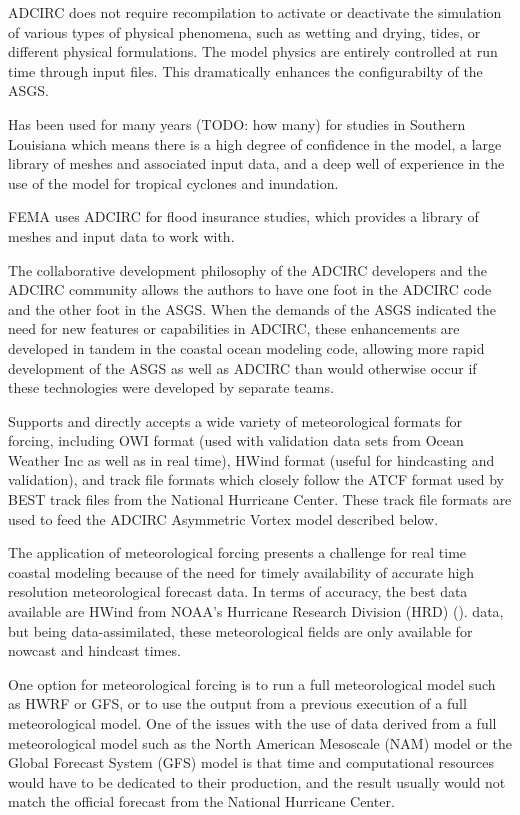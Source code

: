 \documentclass[jmse,article,submit,moreauthors,pdftex,12pt,a4paper]{mdpi}
\begin{document}
ADCIRC does not require recompilation to activate or deactivate the 
simulation of various types of physical phenomena, such as wetting 
and drying, tides, or different physical formulations. The model 
physics are entirely controlled at run time through input files. 
This dramatically enhances the configurabilty of the ASGS. 

Has been used for many years (TODO: how many) for studies in 
Southern Louisiana which means there is a high degree of confidence 
in the model, a large library of meshes and associated input data, 
and a deep well of experience in the use of the model for tropical 
cyclones and inundation. 

FEMA uses ADCIRC for flood insurance studies, which provides a library
of meshes and input data to work with.

The collaborative development philosophy of the ADCIRC developers
and the ADCIRC community allows the authors to have one foot in the
ADCIRC code and the other foot in the ASGS. When the demands of the
ASGS indicated the need for new features or capabilities in ADCIRC, 
these enhancements are developed in tandem in the coastal ocean modeling
code, allowing more rapid development of the ASGS as well as ADCIRC
than would otherwise occur if these technologies were developed by
separate teams. 

Supports and directly accepts a wide variety of meteorological 
formats for forcing, including OWI format (used with validation data 
sets from Ocean Weather Inc as well as in real time), HWind format 
(useful for hindcasting and validation), and track file formats which
closely follow the ATCF format used by BEST track files from the 
National Hurricane Center. These track file formats are used to feed
the ADCIRC Asymmetric Vortex model described below. 

The application of meteorological forcing presents a challenge for 
real time coastal modeling because of the need for timely 
availability of accurate high resolution meteorological forecast 
data. In terms of accuracy, the best data available are HWind from 
NOAA's Hurricane Research Division (HRD) (\cite{PowellMD1998}). 
data, but being data-assimilated, these meteorological fields are 
only available for nowcast and hindcast times.

One option for meteorological forcing is to run a full 
meteorological model such as HWRF or GFS, or to use the output from 
a previous execution of a full meteorological model. One of the 
issues with the use of data derived from a full meteorological model 
such as the North American Mesoscale (NAM) model or the Global 
Forecast System (GFS) model is that time and computational resources 
would have to be dedicated to their production, and the result 
usually would not match the official forecast from the National 
Hurricane Center. 
\end{document}
